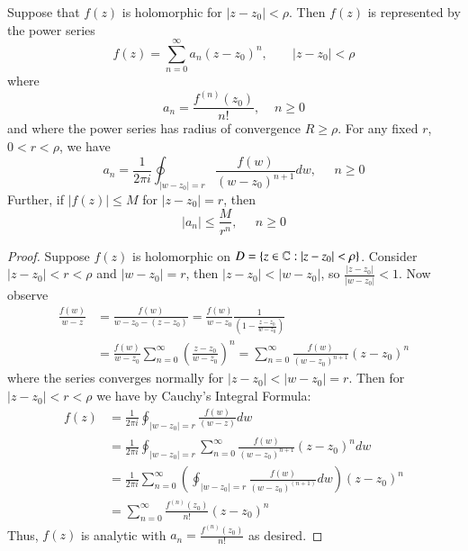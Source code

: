 \documentclass[12pt, a4paper, oneside, openright, titlepage]{book}
\begin{document}
\begin{thm}
    Suppose that $f(z)$ is holomorphic for $|z - z_0| < \rho$. Then $f(z)$ is represented by the power series \begin{equation*}
        f(z) = \sum_{n=0}^{\infty}a_n(z-z_0)^n,\;\;\;\;\;\;\; |z-z_0| < \rho
    \end{equation*}
    where \begin{equation*}
        a_n = \frac{f^{(n)}(z_0)}{n!},\;\;\;\;n \geq 0
    \end{equation*}
    and where the power series has radius of convergence $R \geq \rho$. For any fixed $r$, $0 < r < \rho$, we have \begin{equation*}
        a_n = \frac{1}{2\pi i}\oint_{|w-z_0| = r}\frac{f(w)}{(w-z_0)^{n+1}}dw,\;\;\;\;\;n\geq 0
    \end{equation*}
    Further, if $|f(z)| \leq M$ for $|z-z_0| = r$, then \begin{equation*}
        |a_n| \leq \frac{M}{r^n},\;\;\;\;\; n \geq 0
    \end{equation*}
\end{thm}
\begin{proof}
    Suppose $f(z)$ is holomorphic on $D = \{z \in \mathbb C:|z-z_0| < \rho\}$. Consider $|z-z_0| < r < \rho$ and $|w-z_0| = r$, then $|z-z_0| < |w-z_0|$, so $\frac{|z-z_0|}{|w-z_0|} < 1$. Now observe \begin{align*}
        \frac{f(w)}{w-z} &= \frac{f(w)}{w-z_0-(z-z_0)} = \frac{f(w)}{w-z_0}\frac{1}{\left(1-\frac{z-z_0}{w-z_0}\right)} \\
        &= \frac{f(w)}{w-z_0}\sum_{n=0}^{\infty}\left(\frac{z-z_0}{w-z_0}\right)^n = \sum_{n=0}^{\infty}\frac{f(w)}{(w-z_0)^{n+1}}(z-z_0)^n
    \end{align*}
    where the series converges normally for $|z-z_0| < |w-z_0| = r$. Then for $|z-z_0| < r < \rho$ we have by Cauchy's Integral Formula: \begin{align*}
        f(z) &= \frac{1}{2\pi i}\oint_{|w-z_0| = r}\frac{f(w)}{(w-z)}dw \\
        &= \frac{1}{2\pi i}\oint_{|w-z_0|=r}\sum_{n=0}^{\infty}\frac{f(w)}{(w-z_0)^{n+1}}(z-z_0)^ndw \\
        &= \frac{1}{2\pi i}\sum_{n=0}^{\infty}\left(\oint_{|w-z_0|=r}\frac{f(w)}{(w-z_0)^(n+1)}dw\right)(z-z_0)^n \\
        &= \sum_{n=0}^{\infty}\frac{f^{(n)}(z_0)}{n!}(z-z_0)^n
    \end{align*}
    Thus, $f(z)$ is analytic with $a_n = \frac{f^{(n)}(z_0)}{n!}$ as desired. 
\end{proof}
\end{document}
